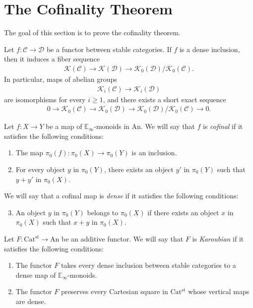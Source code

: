 \documentclass[a4paper,dvipdfmx,11pt,reqno]{amsart}
\newcommand{\C}{\mathcal{C}}
\newcommand{\D}{\mathcal{D}}
\newcommand{\K}{\mathcal{K}}
\newcommand{\An}{\mathrm{An}}
\newcommand{\Catst}{\mathrm{Cat^{st}}}
\newcommand{\Einf}{\mathbb{E}_{\infty}}
\begin{document}
\section{The Cofinality Theorem}

The goal of this section is to prove the cofinality theorem.

\begin{theorem} \label{thrm.cofinality_theorem}
  Let $f : \C \to \D$ be a functor between stable categories.
  If $f$ is a dense inclusion, then it induces a fiber sequence
  \begin{align*}
    \K(\C) \to \K(\D) \to \K_0(\D)/\K_0(\C).
  \end{align*}
  In particular, maps of abelian groups
  \begin{align*}
    \K_i(\C) \to \K_i(\D)
  \end{align*}
  are isomorphisms for every $i \geq 1$, and there exists a short exact sequence 
  \begin{align*}
    0 \to \K_0(\C) \to \K_0(\D) \to \K_0(\D)/\K_0(\C) \to 0.
  \end{align*}
\end{theorem}

\begin{definition}
  Let $f : X \to Y$ be a map of $\Einf$-monoids in $\An$.
  We will say that $f$ is \textit{cofinal} if it satisfies the following conditions:
  \begin{enumerate}
    \item The map $\pi_0(f) : \pi_0(X) \to \pi_0(Y)$ is an inclusion.
    \item For every object $y$ in $\pi_0(Y)$, there exists an object $y'$ in $\pi_0(Y)$ such that $y+y'$ in $\pi_0(X)$.
  \end{enumerate}
  We will say that a cofinal map is \textit{dense} if it satisfies the following conditions:
  \begin{enumerate}[resume]
    \setcounter{enumi}{2}
    \item An object $y$ in $\pi_0(Y)$ belongs to $\pi_0(X)$ if there exists an object $x$ in $\pi_0(X)$ such that $x+y$ in $\pi_0(X)$.
  \end{enumerate}
\end{definition}

\begin{definition}
  Let $F : \Catst \to \An$ be an additive functor.
  We will say that $F$ is \textit{Karoubian} if it satisfies the following conditions:
  \begin{enumerate}
    \item The functor $F$ takes every dense inclusion between stable categories to a dense map of $\Einf$-monoids.
    \item The functor $F$ preserves every Cartesian square in $\Catst$ whose vertical maps are dense.
  \end{enumerate}
\end{definition}
\end{document}
